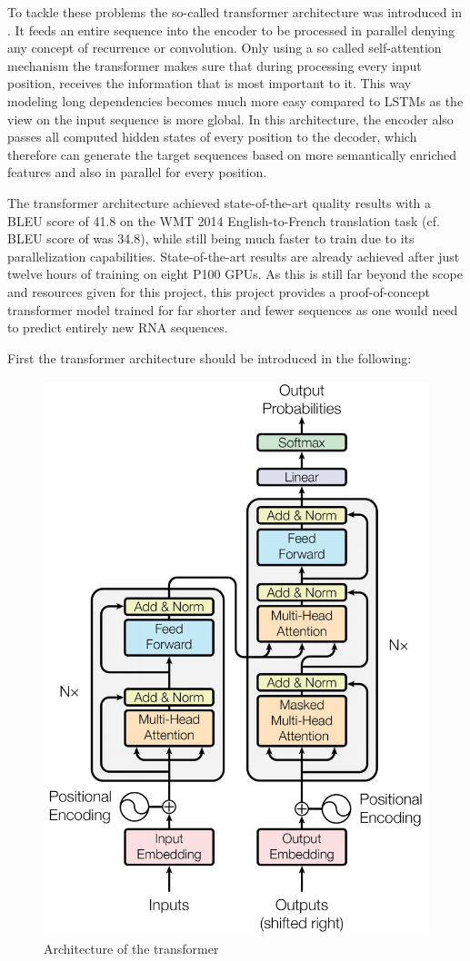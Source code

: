To tackle these problems the so-called transformer architecture was in\-tro\-du\-ced in \cite{Vaswani2017}. It feeds an entire sequence into the encoder to be processed in parallel denying any concept of recurrence or convolution. Only using a so called self-attention mechanism the transformer makes sure that during processing every input position, receives the information that is most important to it. This way modeling long dependencies becomes much more easy compared to \acp{LSTM} as the view on the input sequence is more global. In this architecture, the encoder also passes all computed hidden states of every position to the decoder, which therefore \cite{Vaswani2017} can generate the target sequences based on more semantically enriched features and also in parallel for every position. \cite{Vaswani2017}

The transformer architecture achieved state-of-the-art quality results with a BLEU score of 41.8 on the WMT 2014 English-to-French translation task (cf. BLEU score of \cite{Sutskever2014} was 34.8), while still being much faster to train due to its parallelization capabilities. State-of-the-art results are already achieved after just twelve hours of training on eight P100 \acp{GPU}. As this is still far beyond the scope and resources given for this project, this project provides a proof-of-concept transformer model trained for far shorter and fewer sequences as one would need to predict entirely new \ac{RNA} sequences. \cite{Vaswani2017}

First the transformer architecture should be introduced in the following:

\begin{figure}[ht]
	\centering
	\includegraphics[width=0.5\linewidth]{figures/transformer.png}
	\caption{Architecture of the transformer \cite{Vaswani2017}}
	\label{transformer}
\end{figure}

